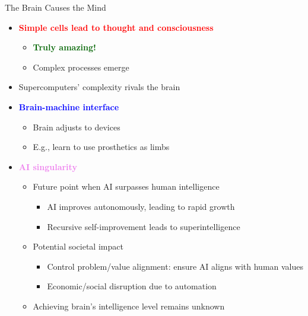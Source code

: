 \documentclass[
  10pt,
  ignorenonframetext,
]{beamer}
\providecommand{\tightlist}{%
  \setlength{\itemsep}{0pt}\setlength{\parskip}{0pt}}
\begin{document}
\begin{frame}{The Brain Causes the Mind}
\label{the-brain-causes-the-mind}
\begin{itemize}
\item
  \textbf{\textcolor{red}{Simple cells lead to thought and consciousness}}

  \begin{itemize}
  \tightlist
  \item
    \textbf{\textcolor{darkgreen}{Truly amazing!}}
  \item
    Complex processes emerge
  \end{itemize}
\item
  Supercomputers' complexity rivals the brain
\item
  \textbf{\textcolor{blue}{Brain-machine interface}}

  \begin{itemize}
  \tightlist
  \item
    Brain adjusts to devices
  \item
    E.g., learn to use prosthetics as limbs
  \end{itemize}
\item
  \textbf{\textcolor{violet}{AI singularity}}

  \begin{itemize}
  \tightlist
  \item
    Future point when AI surpasses human intelligence

    \begin{itemize}
    \tightlist
    \item
      AI improves autonomously, leading to rapid growth
    \item
      Recursive self-improvement leads to superintelligence
    \end{itemize}
  \item
    Potential societal impact

    \begin{itemize}
    \tightlist
    \item
      Control problem/value alignment: ensure AI aligns with human
      values
    \item
      Economic/social disruption due to automation
    \end{itemize}
  \item
    Achieving brain's intelligence level remains unknown
  \end{itemize}
\end{itemize}
\end{frame}
\end{document}
